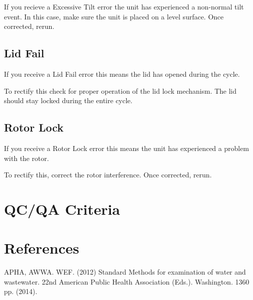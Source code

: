 \documentclass[12pt]{../SOP3_beta}
\begin{document}
\NP If you recieve a Excessive Tilt error the unit has experienced a non-normal tilt event. In this case, make sure the unit is placed on a level surface. Once corrected, rerun. 

\subsection*{Lid Fail}

\NP If you receive a Lid Fail error this means the lid has opened during the cycle. 

\NP To rectify this check for proper operation of the lid lock mechanism. The lid should stay locked during the entire cycle. 

\subsection*{Rotor Lock}

\NP If you receive a Rotor Lock error this means the unit has experienced a problem with the rotor. 

\NP To rectify this, correct the rotor interference. Once corrected, rerun. 

\NP 

\section{QC/QA Criteria}

\section{References}

\NP APHA, AWWA. WEF. (2012) Standard Methods for examination of water and wastewater. 22nd American Public Health Association (Eds.). Washington. 1360 pp. (2014).
\end{document}
